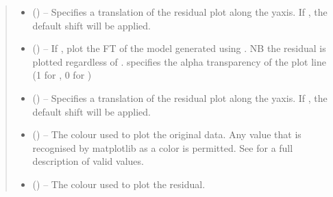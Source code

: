 \documentclass[letterpaper,10pt,english]{sphinxmanual}
\begin{document}
\begin{fulllineitems}
\begin{quote}
\begin{description}
\begin{itemize}
\item {} 
\sphinxAtStartPar
{} (\sphinxstyleliteralemphasis{\sphinxupquote{, }}) – Specifies a translation of the residual plot along the y\sphinxhyphen{}axis. If
, the default shift will be applied.

\item {} 
\sphinxAtStartPar
{} (\sphinxstyleliteralemphasis{\sphinxupquote{, }}) – If , plot the FT of the model generated using .
NB the residual is plotted regardless of . 
specifies the alpha transparency of the plot line (1 for ,
0 for )

\item {} 
\sphinxAtStartPar
{} (\sphinxstyleliteralemphasis{\sphinxupquote{, }}) – Specifies a translation of the residual plot along the y\sphinxhyphen{}axis. If
, the default shift will be applied.

\item {} 
\sphinxAtStartPar
{} (\sphinxstyleliteralemphasis{\sphinxupquote{, }}) – The colour used to plot the original data. Any value that is
recognised by matplotlib as a color is permitted. See
 for a full description of valid values.

\item {} 
\sphinxAtStartPar
{} (\sphinxstyleliteralemphasis{\sphinxupquote{, }}) – The colour used to plot the residual.


\end{itemize}
\end{description}
\end{quote}
\end{fulllineitems}
\end{document}
